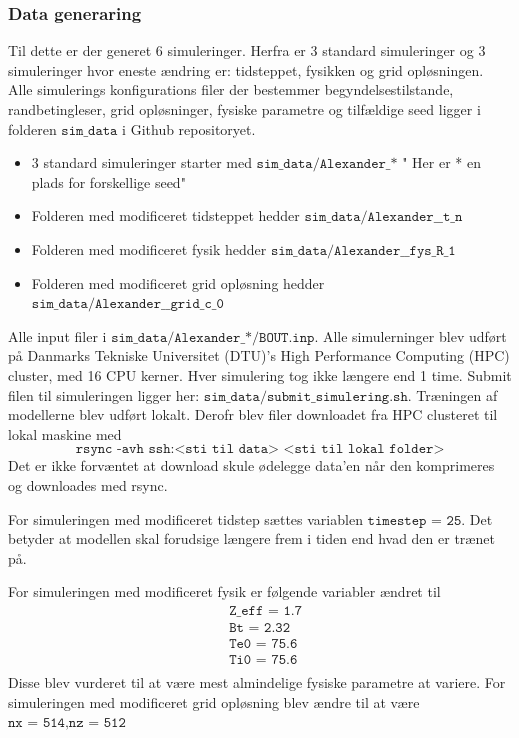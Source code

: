 \subsubsection{Data generaring} \label{ch4_1_1}
Til dette er der generet 6 simuleringer. Herfra er 3 standard simuleringer og 3 simuleringer hvor eneste ændring er: tidsteppet, fysikken og grid opløsningen.
Alle simulerings konfigurations filer der bestemmer begyndelsestilstande, randbetingleser,
grid opløsninger, fysiske parametre og tilfældige seed ligger i folderen $\texttt{sim\_data}$ i Github repositoryet.
\begin{itemize}
    \item 3 standard simuleringer starter med $\texttt{sim\_data/Alexander\_*}$ " Her er * en plads for forskellige seed"
    \item Folderen med modificeret tidsteppet hedder $\texttt{sim\_data/Alexander\_\_t\_n}$
    \item Folderen med modificeret fysik hedder $\texttt{sim\_data/Alexander\_\_fys\_R\_1}$
    \item Folderen med modificeret grid opløsning hedder $\texttt{sim\_data/Alexander\_\_grid\_c\_0}$
\end{itemize}

Alle input filer i $\texttt{sim\_data/Alexander\_*/BOUT.inp}$.
Alle simulerninger blev udført på Danmarks Tekniske Universitet (DTU)'s High Performance Computing (HPC) cluster, med 16 CPU kerner.
Hver simulering tog ikke længere end 1 time.
Submit filen til simuleringen ligger her: $\texttt{sim\_data/submit\_simulering.sh}$.
Træningen af modellerne blev udført lokalt. Derofr blev filer downloadet fra HPC clusteret til lokal maskine med 
\[
    \texttt{rsync -avh ssh:<sti til data> <sti til lokal folder>}
\]
Det er ikke forvæntet at download skule ødelegge data'en når den komprimeres og downloades med rsync.

For simuleringen med modificeret tidstep sættes variablen $\texttt{timestep = 25}$. Det betyder at modellen skal forudsige længere frem
i tiden end hvad den er trænet på.

For simuleringen med modificeret fysik er følgende variabler ændret til
\begin{align*}
    &\texttt{Z\_eff  = 1.7} \\
    &\texttt{Bt      = 2.32} \\
    &\texttt{Te0     = 75.6} \\
    &\texttt{Ti0     = 75.6} \\
\end{align*}
Disse blev vurderet til at være mest almindelige fysiske parametre at variere.
For simuleringen med modificeret grid opløsning blev ændre til at være $\texttt{nx = 514}, \texttt{nz = 512}$

